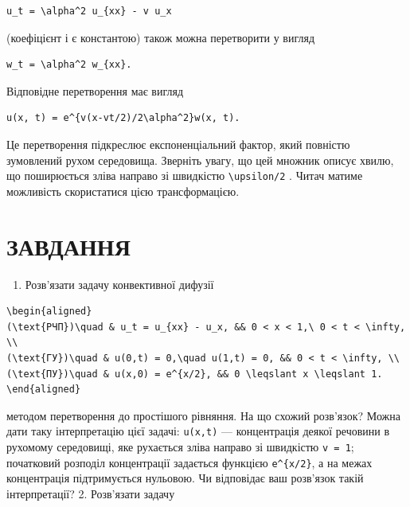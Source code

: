 \documentclass[
  ukrainian,
]{article}
\providecommand{\tightlist}{%
  \setlength{\itemsep}{0pt}\setlength{\parskip}{0pt}}
\begin{document}
\begin{verbatim}
u_t = \alpha^2 u_{xx} - v u_x
\end{verbatim}

(коефіцієнт і є константою) також можна перетворити у вигляд

\begin{verbatim}
w_t = \alpha^2 w_{xx}.
\end{verbatim}

Відповідне перетворення має вигляд

\begin{verbatim}
u(x, t) = e^{v(x-vt/2)/2\alpha^2}w(x, t).
\end{verbatim}

Це перетворення підкреслює експоненціальний фактор, який повністю
зумовлений рухом середовища. Зверніть увагу, що цей множник описує
хвилю, що поширюється зліва направо зі швидкістю
\texttt{\textbackslash{}upsilon/2} . Читач матиме можливість
скористатися цією трансформацією.

\section{ЗАВДАННЯ}\label{ux437ux430ux432ux434ux430ux43dux43dux44f-5}

\begin{enumerate}
\def\labelenumi{\arabic{enumi}.}
\tightlist
\item
  Розв'язати задачу конвективної дифузії
\end{enumerate}

\begin{verbatim}
\begin{aligned}
(\text{РЧП})\quad & u_t = u_{xx} - u_x, && 0 < x < 1,\ 0 < t < \infty, \\
(\text{ГУ})\quad & u(0,t) = 0,\quad u(1,t) = 0, && 0 < t < \infty, \\
(\text{ПУ})\quad & u(x,0) = e^{x/2}, && 0 \leqslant x \leqslant 1.
\end{aligned}
\end{verbatim}

методом перетворення до простішого рівняння. На що схожий розв'язок?
Можна дати таку інтерпретацію цієї задачі: \texttt{u(x,t)} ---
концентрація деякої речовини в рухомому середовищі, яке рухається зліва
направо зі швидкістю \texttt{v\ =\ 1}; початковий розподіл концентрації
задається функцією \texttt{e\^{}\{x/2\}}, а на межах концентрація
підтримується нульовою. Чи відповідає ваш розв'язок такій інтерпретації?
2. Розв'язати задачу
\end{document}
